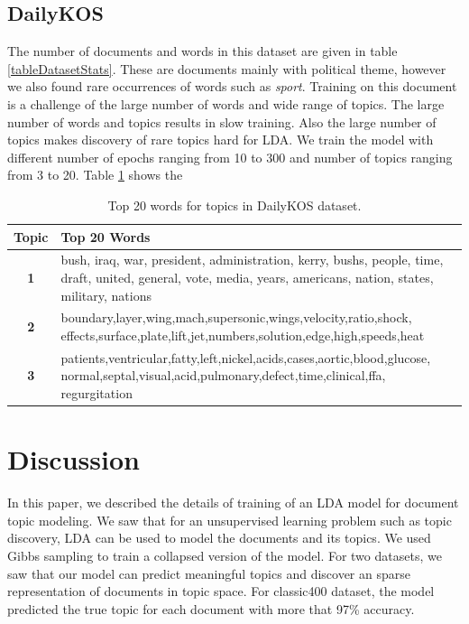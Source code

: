 \documentclass[twoside,12pt]{article}
\begin{document}
\subsection{DailyKOS}
The number of documents and words in this dataset are given in table \ref{tableDatasetStats}. These are  documents mainly with political theme, however we also found rare occurrences of words such as \emph{sport}. Training on this document is a challenge of the large number of words and wide range of topics. The large number of words and topics results in slow training. Also the large number of topics makes discovery of rare topics hard for LDA. We train the model with different number of epochs ranging from 10 to 300 and number of topics ranging from 3 to 20. Table \ref{tableDKTopWords} shows the 



\begin{table}[!]
\begin{center}
\begin{tabular}{| c | p{12cm} |}
\hline
\textbf{Topic}& \textbf{Top 20 Words}  \\ \hline
\textbf{1}&bush, iraq, war, president, administration, kerry, bushs, people, time, draft, united, general, vote, media, years, americans, nation, states, military, nations\\ \hline
\textbf{2}&boundary,layer,wing,mach,supersonic,wings,velocity,ratio,shock, effects,surface,plate,lift,jet,numbers,solution,edge,high,speeds,heat\\
 \hline
\textbf{3}&patients,ventricular,fatty,left,nickel,acids,cases,aortic,blood,glucose, normal,septal,visual,acid,pulmonary,defect,time,clinical,ffa, regurgitation\\
 \hline
 
\end{tabular}
\caption{Top 20 words for topics in DailyKOS dataset.}
\label{tableDKTopWords}
\end{center}
\end{table}


\section{Discussion}
In this paper, we described the details of training of an LDA model for document topic modeling. We saw that for an unsupervised learning problem such as topic discovery, LDA can be used to model the documents and its topics. We used Gibbs sampling to train a collapsed version of the model. For two datasets, we saw that our model can predict meaningful topics and discover an sparse representation of documents in topic space. For classic400 dataset, the model predicted the true topic for each document with more that 97\% accuracy.
\end{document}
